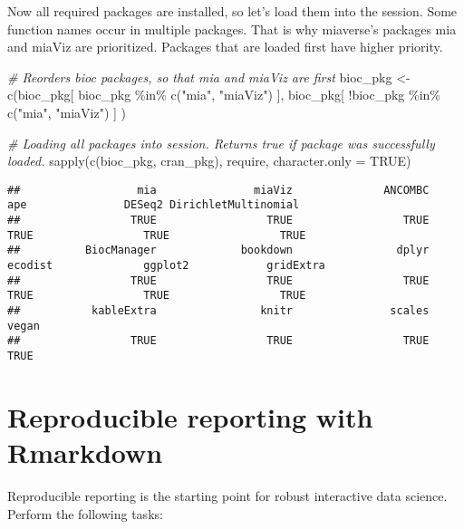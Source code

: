 \documentclass[
]{book}
\newenvironment{Shaded}{\begin{snugshade}}{\end{snugshade}}
\newcommand{\AttributeTok}[1]{\textcolor[rgb]{0.77,0.63,0.00}{#1}}
\newcommand{\CommentTok}[1]{\textcolor[rgb]{0.56,0.35,0.01}{\textit{#1}}}
\newcommand{\ConstantTok}[1]{\textcolor[rgb]{0.00,0.00,0.00}{#1}}
\newcommand{\FunctionTok}[1]{\textcolor[rgb]{0.00,0.00,0.00}{#1}}
\newcommand{\NormalTok}[1]{#1}
\newcommand{\OtherTok}[1]{\textcolor[rgb]{0.56,0.35,0.01}{#1}}
\newcommand{\SpecialCharTok}[1]{\textcolor[rgb]{0.00,0.00,0.00}{#1}}
\newcommand{\StringTok}[1]{\textcolor[rgb]{0.31,0.60,0.02}{#1}}
\begin{document}
Now all required packages are installed, so let's load them into the session.
Some function names occur in multiple packages. That is why miaverse's packages
mia and miaViz are prioritized. Packages that are loaded first have higher priority.

\begin{Shaded}
\begin{Highlighting}[]
\CommentTok{\# Reorders bioc packages, so that mia and miaViz are first}
\NormalTok{bioc\_pkg }\OtherTok{\textless{}{-}} \FunctionTok{c}\NormalTok{(bioc\_pkg[ bioc\_pkg }\SpecialCharTok{\%in\%} \FunctionTok{c}\NormalTok{(}\StringTok{"mia"}\NormalTok{, }\StringTok{"miaViz"}\NormalTok{) ], bioc\_pkg[ }\SpecialCharTok{!}\NormalTok{bioc\_pkg }\SpecialCharTok{\%in\%} \FunctionTok{c}\NormalTok{(}\StringTok{"mia"}\NormalTok{, }\StringTok{"miaViz"}\NormalTok{) ] ) }

\CommentTok{\# Loading all packages into session. Returns true if package was successfully loaded.}
\FunctionTok{sapply}\NormalTok{(}\FunctionTok{c}\NormalTok{(bioc\_pkg, cran\_pkg), require, }\AttributeTok{character.only =} \ConstantTok{TRUE}\NormalTok{)}
\end{Highlighting}
\end{Shaded}

\begin{verbatim}
##                  mia               miaViz              ANCOMBC                  ape               DESeq2 DirichletMultinomial 
##                 TRUE                 TRUE                 TRUE                 TRUE                 TRUE                 TRUE 
##          BiocManager             bookdown                dplyr              ecodist              ggplot2            gridExtra 
##                 TRUE                 TRUE                 TRUE                 TRUE                 TRUE                 TRUE 
##           kableExtra                knitr               scales                vegan 
##                 TRUE                 TRUE                 TRUE                 TRUE
\end{verbatim}

\hypertarget{reproducible-reporting-with-rmarkdown}{%
\chapter{Reproducible reporting with Rmarkdown}\label{reproducible-reporting-with-rmarkdown}}

Reproducible reporting is the starting point for robust interactive
data science. Perform the following tasks:
\end{document}
